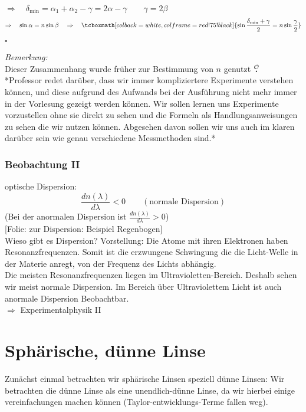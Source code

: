 \documentclass[titlepage,11pt,a4paper,ngerman]{report}
\newcommand{\tx}[1]{\textrm{#1}}
\newcommand{\folie}[1]{\color{gray}[Folie: #1]\color{black}}
\newcommand{\lcom}[1]{\color{MidnightBlue}#1\color{black}}
\newcommand{\mau}{$\buildrel \mathcal{O} \over{\textbf{.}}$}
\newcommand{\rmbox}[1]{\tcboxmath[colback=white,colframe=red!75!black]{#1}}
\begin{document}
\noindent
$ \Rightarrow \quad \delta_{\tx{min}} = \alpha_1 + \alpha_2 - \gamma = 2 \alpha - \gamma \qquad \gamma = 2 \beta $
\begin{equation*}
\Rightarrow \quad \sin \alpha = n \sin \beta \quad \Rightarrow \quad \rmbox{\sin \frac{\delta_{\tx{min}} + \gamma}{2} = n \sin \frac{\gamma}{2}}
\end{equation*}
\begin{flushright}
	$ \square $
\end{flushright}
\emph{Bemerkung:}\\
Dieser Zusammenhang wurde früher zur Bestimmung von $ n $ genutzt \mau\\
\lcom{*Professor redet darüber, dass wir immer kompliziertere Experimente verstehen können, und diese aufgrund des Aufwands bei der Ausführung nicht mehr immer in der Vorlesung gezeigt werden können. Wir sollen lernen uns Experimente vorzustellen ohne sie direkt zu sehen und die Formeln als Handlungsanweisungen zu sehen die wir nutzen können. Abgesehen davon sollen wir uns auch im klaren darüber sein wie genau verschiedene Messmethoden sind.*}

\subsubsection{Beobachtung II}
optische Dispersion:
\begin{equation*}
\frac{dn(\lambda)}{d\lambda} < 0 \qquad (\tx{normale Dispersion})
\end{equation*}
(Bei der anormalen Dispersion ist $ \frac{d n(\lambda)}{d\lambda} > 0 $)\\
\folie{zur Dispersion: Beispiel Regenbogen}\\[5pt]
\lcom{Wieso gibt es Dispersion? Vorstellung: Die Atome mit ihren Elektronen haben Resonanzfrequenzen. Somit ist die erzwungene Schwingung die die Licht-Welle in der Materie anregt, von der Frequenz des Lichts abhängig.\\
Die meisten Resonanzfrequenzen liegen im Ultravioletten-Bereich. Deshalb sehen wir meist normale Dispersion. Im Bereich über Ultraviolettem Licht ist auch anormale Dispersion Beobachtbar.}\\[5pt]
$ \Rightarrow $ Experimentalphysik II

\section{Sphärische, dünne Linse}
\lcom{Zunächst einmal betrachten wir sphärische Linsen speziell dünne Linsen: Wir betrachten die dünne Linse als eine unendlich-dünne Linse, da wir hierbei einige vereinfachungen machen können (Taylor-entwicklungs-Terme fallen weg).}
\end{document}
